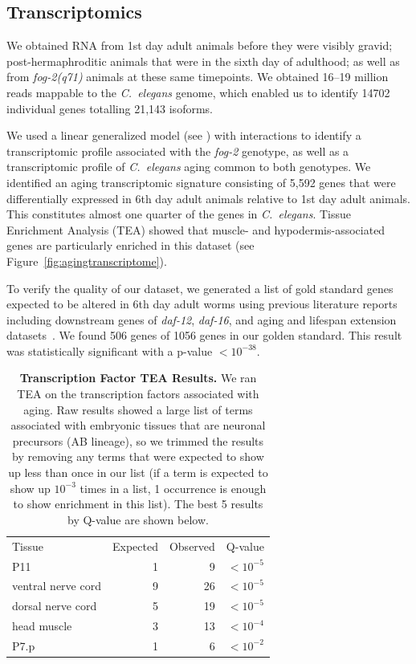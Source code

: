 \documentclass[10pt,letterpaper,twocolumn]{article}
\newcommand{\cel}{\emph{C.~elegans}}
\newcommand{\fog}{\emph{fog-2}}
\newcommand{\agen}{5,592}
\newcommand{\goldn}{1056}
\newcommand{\goldfound}{506}
\newcommand{\goldpval}{$<10^{-38}$}
\begin{document}
\subsection*{Transcriptomics}
\label{sub:Transcriptomics}

We obtained RNA from 1st day adult animals before they were visibly gravid; post-hermaphroditic animals that were in the sixth day of adulthood; as well as from \fog{}\emph{(q71)} animals at these same timepoints. We obtained 16--19 million reads mappable to the \cel{} genome, which enabled us to identify 14702 individual genes totalling 21,143 isoforms.

We used a linear generalized model (see ) with interactions to identify a transcriptomic profile associated with the \fog{} genotype, as well as a transcriptomic profile of \cel{} aging common to both genotypes. We identified an aging transcriptomic signature consisting of \agen{} genes that were differentially expressed in 6th day adult animals relative to 1st day adult animals. This constitutes almost one quarter of the genes in \cel{}. Tissue Enrichment Analysis (TEA) showed that muscle- and hypodermis-associated genes are particularly enriched in this dataset (see Figure~\ref{fig:agingtranscriptome}).

To verify the quality of our dataset, we generated a list of gold standard genes expected to be altered in 6th day adult worms using previous literature reports including downstream genes of \emph{daf-12}, \emph{daf-16}, and aging and lifespan extension datasets~\cite{Murphy2003,Halaschek-wiener2005,Lund2002,McCormick2012,Eckley2013}. We found \goldfound{} genes of \goldn{} genes in our golden standard. This result was statistically significant with a p-value \goldpval{}.

\begin{table}
\renewcommand{\familydefault}{\sfdefault}\normalfont{}
\centering
\caption{\textbf{Transcription Factor TEA Results.} We ran TEA on the transcription factors associated with aging. Raw results showed a large list of terms associated with embryonic tissues that are neuronal precursors (AB lineage), so we trimmed the results by removing any terms that were expected to show up less than once in our list (if a term is expected to show up $10^{-3}$ times in a list, 1 occurrence is enough to show enrichment in this list). The best 5 results by Q-value are shown below.}
\begin{tabular}{lrrr}
Tissue & Expected & Observed & Q-value \\
P11	& 1 & 9 & $<10^{-5}$\\
ventral nerve cord &	9 &	26 &	$<10^{-5}$\\
dorsal nerve cord &	5 &	19 & $<10^{-5}$\\
head muscle	& 3	& 13 &	$<10^{-4}$\\
P7.p & 1 &	6	& $<10^{-2}$\\
\end{tabular}
\label{tab:tea_tf_age}
\end{table}
\end{document}
